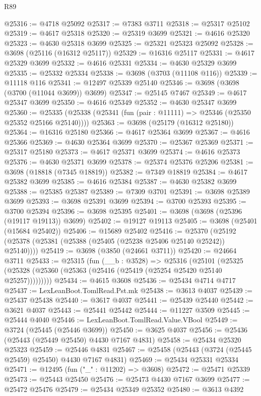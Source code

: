 \begin{lexlean}{R89}
\begin{coremodule}
@25316 := @4718 @25092
@25317 := @7383 @3711
@25318 := @25317 @25102
@25319 := @4617 @25318
@25320 := @25319 @3699
@25321 := @4616 @25320
@25323 := @4630 @25318 @3699
@25325 := @25321 @25323 @25092
@25328 := @3698 (@25116 (@16312 @25117))
@25329 := @16316 @25117
@25331 := @4617 @25329 @3699
@25332 := @4616 @25331
@25334 := @4630 @25329 @3699
@25335 := @25332 @25334
@25338 := @3698 (@3703 (@11108 @116))
@25339 := @11118 @116
@25341 := @12497 @25339 @25140
@25346 := @3698 (@3698 (@3700 (@11044 @3699)) @3699)
@25347 := @25145 @7467
@25349 := @4617 @25347 @3699
@25350 := @4616 @25349
@25352 := @4630 @25347 @3699
@25360 := @25335 (@25338 (@25341 (fun (pair : @11111) => @25346 (@25350 @25352 @25166 @25140))))
@25363 := @3698 (@25179 (@16312 @25180))
@25364 := @16316 @25180
@25366 := @4617 @25364 @3699
@25367 := @4616 @25366
@25369 := @4630 @25364 @3699
@25370 := @25367 @25369
@25371 := @25317 @25180
@25373 := @4617 @25371 @3699
@25374 := @4616 @25373
@25376 := @4630 @25371 @3699
@25378 := @25374 @25376 @25206
@25381 := @3698 (@18818 (@7345 @18819))
@25382 := @7349 @18819
@25384 := @4617 @25382 @3699
@25385 := @4616 @25384
@25387 := @4630 @25382 @3699
@25388 := @25385 @25387
@25389 := @7309 @3701
@25391 := @3698 @25389 @3699
@25393 := @3698 @25391 @3699
@25394 := @3700 @25393
@25395 := @3700 @25394
@25396 := @3698 @25395
@25401 := @3698 (@3698 (@25396 (@19117 @19113)) @3699)
@25402 := @19127 @19113
@25405 := @3698 (@25401 (@15684 @25402))
@25406 := @15689 @25402
@25416 := @25370 (@25192 (@25378 (@25381 (@25388 (@25405 (@25238 @25406 @25140 @25242)) @25140))))
@25419 := @3698 (@3850 (@24661 @3711))
@25420 := @24664 @3711
@25433 := @25315
    (fun (__b : @3528) =>
    @25316
      (@25101 (@25325 (@25328 (@25360 (@25363 (@25416 (@25419 (@25254 @25420 @25140 @25257)))))))))
@25434 := @4615 @3608
@25436 := @25434 @4714 @4717
@25437 := LexLeanBoot.TomlRead.Pst.mk
@25438 := @3613 @4037
@25439 := @25437 @25438
@25440 := @3617 @4037
@25441 := @25439 @25440
@25442 := @3621 @4037
@25443 := @25441 @25442
@25444 := @11227 @3509
@25445 := @25444 @4040
@25446 := LexLeanBoot.TomlRead.Value.VBool
@25449 := @3724 (@25445 (@25446 @3699))
@25450 := @3625 @4037
@25456 := @25436 (@25443 (@25449 @25450) @4430 @7167 @4831)
@25458 := @25434 @25320 @25323
@25459 := @25446 @4831
@25467 := @25458 (@25443 (@3724 (@25445 @25459) @25450) @4430 @7167 @4831)
@25469 := @25434 @25331 @25334
@25471 := @12495 (fun ("_" : @11202) => @3608)
@25472 := @25471 @25339
@25473 := @25443 @25450
@25476 := @25473 @4430 @7167 @3699
@25477 := @25472 @25476
@25479 := @25434 @25349 @25352
@25480 := @3613 @4392

\end{coremodule}
\end{lexlean}

